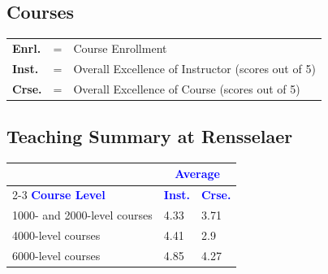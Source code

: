 \subsection{Courses}

\begin{framed}
\begin{tabular}{lll}
\textbf{Enrl.} & = & Course Enrollment\\
\textbf{Inst.} & = & Overall Excellence of Instructor (scores out of 5)\\
\textbf{Crse.} & = & Overall Excellence of Course (scores out of 5)\\
\end{tabular}
\end{framed}

\subsection*{Teaching Summary at Rensselaer}

\begin{longtable}{|p{} p{} p{}|}
\hline
& \multicolumn{2}{c|}{\textcolor{blue}{{Average}}} \\\cline{2-3}
\textcolor{blue}{\textbf{Course Level}} & \textcolor{blue}{\textbf{Inst.}} & \textcolor{blue}{\textbf{Crse.}}\\ 
\hline\hline
1000- and 2000-level courses & 4.33 & 3.71 \\ \hline
4000-level courses & 4.41 & 2.9 \\ \hline
6000-level courses & 4.85 & 4.27 \\ \hline
\end{longtable}

